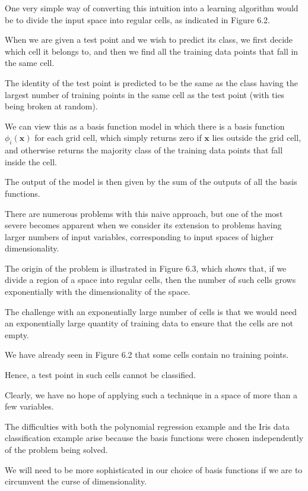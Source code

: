 \documentclass{article}
\begin{document}
One very simple way of converting this intuition into a learning algorithm would be to divide the input space into regular cells, as indicated in Figure 6.2. 

When we are given a test point and we wish to predict its class, we first decide which cell it belongs to, and then we find all the training data points that fall in the same cell. 

The identity of the test point is predicted to be the same as the class having the largest number of training points in the same cell as the test point (with ties being broken at random). 

We can view this as a basis function model in which there is a basis function $\phi_i(\mathbf{x})$ for each grid cell, which simply returns zero if $\mathbf{x}$ lies outside the grid cell, and otherwise returns the majority class of the training data points that fall inside the cell. 

The output of the model is then given by the sum of the outputs of all the basis functions.

There are numerous problems with this naive approach, but one of the most severe becomes apparent when we consider its extension to problems having larger numbers of input variables, corresponding to input spaces of higher dimensionality. 

The origin of the problem is illustrated in Figure 6.3, which shows that, if we divide a region of a space into regular cells, then the number of such cells grows exponentially with the dimensionality of the space. 

The challenge with an exponentially large number of cells is that we would need an exponentially large quantity of training data to ensure that the cells are not empty. 

We have already seen in Figure 6.2 that some cells contain no training points. 

Hence, a test point in such cells cannot be classified. 

Clearly, we have no hope of applying such a technique in a space of more than a few variables. 

The difficulties with both the polynomial regression example and the Iris data classification example arise because the basis functions were chosen independently of the problem being solved. 

We will need to be more sophisticated in our choice of basis functions if we are to circumvent the curse of dimensionality.
\end{document}
